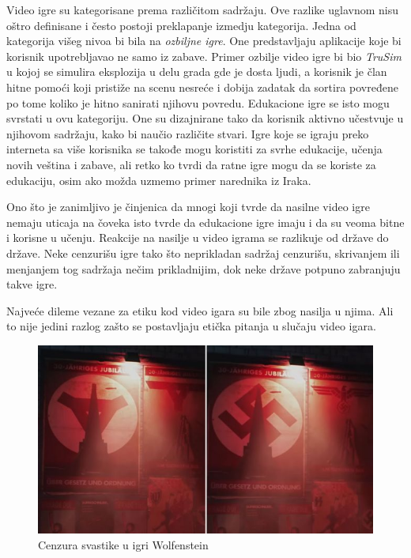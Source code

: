 \documentclass[a4paper]{article}
\begin{document}
Video igre su kategorisane prema različitom sadržaju. Ove razlike uglavnom nisu oštro definisane i često postoji
preklapanje izmedju kategorija. Jedna od kategorija višeg nivoa bi bila na {\em ozbiljne igre}. One predstavljaju aplikacije
koje bi korisnik upotrebljavao ne samo iz zabave. Primer ozbilje video igre bi bio {\em TruSim }
u kojoj se simulira eksplozija u delu grada gde je dosta ljudi, a korisnik je član hitne pomoći koji pristiže na scenu nesreće
i dobija zadatak da sortira povređene po tome koliko je hitno sanirati njihovu povredu. Edukacione igre se isto mogu svrstati u ovu kategoriju.
One su dizajnirane tako da korisnik aktivno učestvuje u njihovom sadržaju, kako bi naučio različite stvari. Igre koje se igraju 
preko interneta sa više korisnika se takođe mogu koristiti za svrhe edukacije, učenja novih veština i zabave,
ali retko ko tvrdi da ratne igre mogu da se koriste za edukaciju, osim ako možda uzmemo primer narednika iz Iraka.

Ono što je zanimljivo je činjenica da mnogi koji tvrde da nasilne video igre nemaju uticaja na čoveka isto tvrde
da edukacione igre imaju i da su veoma bitne i korisne u učenju. Reakcije na nasilje u video igrama se razlikuje
od države do države. Neke cenzurišu igre tako što neprikladan sadržaj cenzurišu, skrivanjem ili menjanjem tog 
sadržaja nečim prikladnijim, dok neke države potpuno zabranjuju takve igre.

Najveće dileme vezane za etiku kod video igara su bile zbog nasilja u njima. Ali to nije jedini razlog zašto se 
postavljaju etička pitanja u slučaju video igara. 

\begin{figure}[h!]
	\begin{center}
		\includegraphics[scale=0.6]{wolfensteinyoungblood.jpg}
	\end{center}
	\caption{Cenzura svastike u igri Wolfenstein}
\end{figure}
\end{document}
